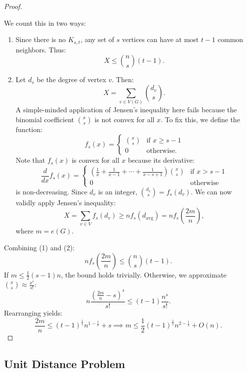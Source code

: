 \documentclass[a4paper]{article}
\begin{document}
\begin{proof}
\begin{center}
\begin{tikzpicture}
\end{tikzpicture}
\end{center}
        We count this in two ways:
        \begin{enumerate}
            \item Since there is no $K_{s,t}$, any set of $s$ vertices can have at most $t-1$ common neighbors. Thus:
            \[ X \leq {n \choose s}(t-1). \]
            \item Let $d_v$ be the degree of vertex $v$. Then:
            \[
            X = \sum_{v\in V(G)}{d_v \choose s}.
            \] 
            A simple-minded application of Jensen's inequality here fails because the binomial coefficient $\binom{x}{s}$ is not convex for all $x$. To fix this, we define the function:
            \[
            f_s(x)=\begin{cases}
                {x \choose s} & \text{if } x\geq s-1\\
                0 & \text{otherwise.}
            \end{cases}
            \]
            Note that $f_s(x)$ is convex for all $x$ because its derivative:
            \[
            \frac{d}{dx}f_s(x)=\begin{cases}
                \left( \frac{1}{x}+\frac{1}{x-1}+\cdots + \frac{1}{x-s+1} \right) { x \choose s} & \text{if } x>s-1\\
                0 & \text{otherwise}
            \end{cases}
            \] 
            is non-decreasing. Since $d_v$ is an integer, $\binom{d_v}{s} = f_s(d_v)$. We can now validly apply Jensen's inequality:
            \[ X = \sum_{v \in V} f_s(d_v) \geq n f_s(d_{\text{avg}}) = n f_s \left( \frac{2m}{n} \right), \]
            where $m=e(G)$. 
        \end{enumerate}
        Combining (1) and (2):
        \[
        n f_s \left(  \frac{2m}{n} \right) \leq {n \choose s}(t-1).
        \]
        If $m \leq \frac{1}{2}(s-1)n$, the bound holds trivially. Otherwise, we approximate ${x \choose s} \approx \frac{x^s}{s!}$:
        \[
        n \frac{\left (\frac{2m}{n}-s\right )^s}{s!} \leq (t-1)\frac{n^s}{s!}.
        \] 
        Rearranging yields:
        \[
        \frac{2m}{n} \leq (t-1)^{\frac{1}{s}} n^{1-\frac{1}{s}} + s \implies m \leq \frac{1}{2}(t-1)^{\frac{1}{s}} n^{2-\frac{1}{s}} + O(n).
        \]
\end{proof}

\subsection{Unit Distance Problem}
\end{document}

